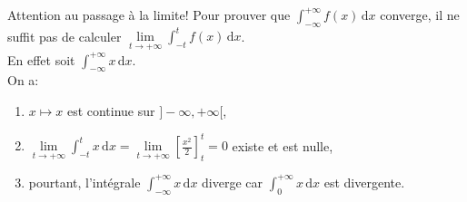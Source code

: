 \documentclass{book}
\begin{document}
\begin{Remarque}
Attention au passage à la limite! Pour prouver que $\int_{-\infty}^{+\infty}f(x)\,\mathrm dx$ converge, il ne suffit pas de calculer $\lim\limits_{t\to +\infty }\int_{-t}^t f(x)\,\mathrm dx$.\\
En effet soit $\int_{-\infty}^{+\infty} {x}\,\mathrm dx.$\\
On a:
\begin{enumerate}
\item
  $x\mapsto x$ est continue sur $]-\infty ,+\infty [$,
\item
  $\lim\limits_{t\to +\infty }\int_{-t}^t x\,\mathrm dx =\lim\limits_{t\to +\infty } [\frac{x^2}{2}]_t^t=0  $ existe et est nulle,
\item
  pourtant, l'intégrale $\int_{-\infty }^{+\infty } x\,\mathrm dx$ diverge car $\int_{0 }^{+\infty } x\,\mathrm dx$ est divergente.
\end{enumerate}
\begin{center}
\end{center}
\end{Remarque}
\end{document}
